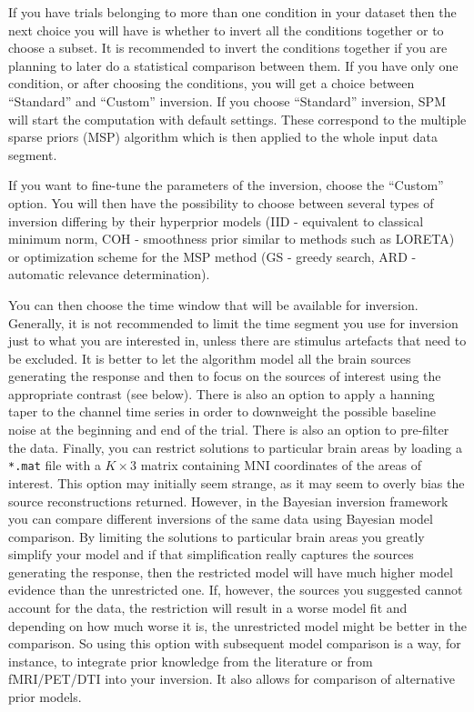 If you have trials belonging to more than one condition in your dataset then the next choice you will have is whether to invert all the conditions together or to choose a subset. It is recommended to invert the conditions together if you are planning to later do a statistical comparison between them. If you have only one condition, or after choosing the conditions, you will get a choice between ``Standard'' and ``Custom'' inversion. If you choose ``Standard'' inversion, SPM will start the computation with default settings. These correspond to the multiple sparse priors (MSP) algorithm \cite{karl_msp} which is then applied to the whole input data segment.

If you want to fine-tune the parameters of the inversion, choose the ``Custom'' option. You will then have the possibility to choose between several types of inversion differing by their hyperprior models (IID - equivalent to classical minimum norm, COH - smoothness prior similar to methods such as LORETA) or optimization scheme for the MSP method (GS - greedy search, ARD - automatic relevance determination).

You can then choose the time window that will be available for inversion. Generally, it is not recommended to limit the time segment you use for inversion just to what you are interested in, unless there are stimulus artefacts that need to be excluded. It is better to let the algorithm model all the brain sources generating the response and then to focus on the sources of interest using the appropriate contrast (see below). There is also an option to apply a hanning taper to the channel time series in order to downweight the possible baseline noise at the beginning and end of the trial. There is also an option to pre-filter the data. Finally, you can restrict solutions to particular brain areas by loading a \texttt{*.mat} file with a $K \times 3$ matrix containing MNI coordinates of the areas of interest. This option may initially seem strange, as it may seem to overly bias the source reconstructions returned. However, in the Bayesian inversion framework you can compare different inversions of the same data using Bayesian model comparison. By limiting the solutions to particular brain areas you greatly simplify your model and if that simplification really captures the sources generating the response, then the restricted model will have much higher model evidence than the unrestricted one. If, however, the sources you suggested cannot account for the data, the restriction will result in a worse model fit and depending on how much worse it is, the unrestricted model might be better in the comparison. So using this option with subsequent model comparison is a way, for instance, to integrate prior knowledge from the literature or from fMRI/PET/DTI into your inversion. It also allows for comparison of alternative prior models.

